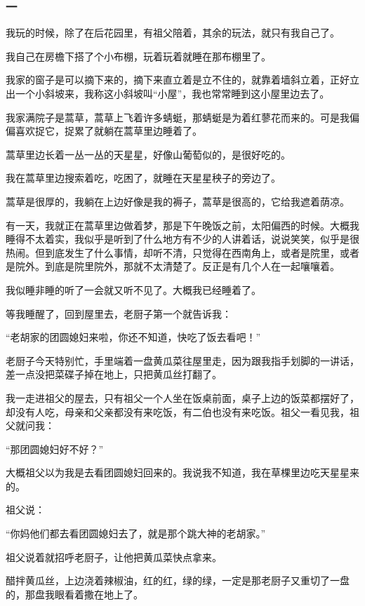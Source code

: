 \subsubsection*{一}
\par 我玩的时候，除了在后花园里，有祖父陪着，其余的玩法，就只有我自己了。
\par 我自己在房檐下搭了个小布棚，玩着玩着就睡在那布棚里了。
\par 我家的窗子是可以摘下来的，摘下来直立着是立不住的，就靠着墙斜立着，正好立出一个小斜坡来，我称这小斜坡叫“小屋”，我也常常睡到这小屋里边去了。
\par 我家满院子是蒿草，蒿草上飞着许多蜻蜓，那蜻蜓是为着红蓼花而来的。可是我偏偏喜欢捉它，捉累了就躺在蒿草里边睡着了。
\par 蒿草里边长着一丛一丛的天星星，好像山葡萄似的，是很好吃的。
\par 我在蒿草里边搜索着吃，吃困了，就睡在天星星秧子的旁边了。
\par 蒿草是很厚的，我躺在上边好像是我的褥子，蒿草是很高的，它给我遮着荫凉。
\par 有一天，我就正在蒿草里边做着梦，那是下午晚饭之前，太阳偏西的时候。大概我睡得不太着实，我似乎是听到了什么地方有不少的人讲着话，说说笑笑，似乎是很热闹。但到底发生了什么事情，却听不清，只觉得在西南角上，或者是院里，或者是院外。到底是院里院外，那就不太清楚了。反正是有几个人在一起嚷嚷着。
\par 我似睡非睡的听了一会就又听不见了。大概我已经睡着了。
\par 等我睡醒了，回到屋里去，老厨子第一个就告诉我：
\par “老胡家的团圆媳妇来啦，你还不知道，快吃了饭去看吧！”
\par 老厨子今天特别忙，手里端着一盘黄瓜菜往屋里走，因为跟我指手划脚的一讲话，差一点没把菜碟子掉在地上，只把黄瓜丝打翻了。
\par 我一走进祖父的屋去，只有祖父一个人坐在饭桌前面，桌子上边的饭菜都摆好了，却没有人吃，母亲和父亲都没有来吃饭，有二伯也没有来吃饭。祖父一看见我，祖父就问我：
\par “那团圆媳妇好不好？”
\par 大概祖父以为我是去看团圆媳妇回来的。我说我不知道，我在草棵里边吃天星星来的。
\par 祖父说：
\par “你妈他们都去看团圆媳妇去了，就是那个跳大神的老胡家。”
\par 祖父说着就招呼老厨子，让他把黄瓜菜快点拿来。
\par 醋拌黄瓜丝，上边浇着辣椒油，红的红，绿的绿，一定是那老厨子又重切了一盘的，那盘我眼看着撒在地上了。

